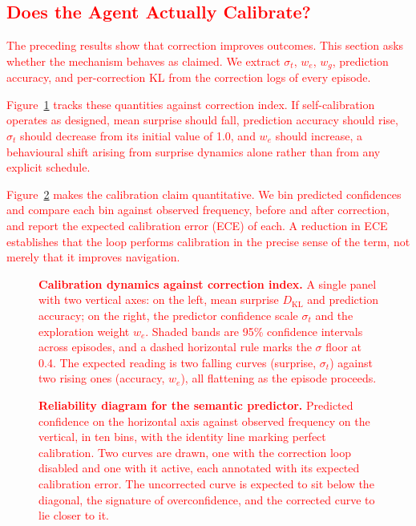 \subsection{\textcolor{red}{Does the Agent Actually Calibrate?}}

\textcolor{red}{The preceding results show that correction improves outcomes. This section asks whether the mechanism behaves as claimed. We extract $\sigma_t$, $w_e$, $w_g$, prediction accuracy, and per-correction KL from the correction logs of every episode.}

\textcolor{red}{Figure~\ref{fig:calib} tracks these quantities against correction index. If self-calibration operates as designed, mean surprise should fall, prediction accuracy should rise, $\sigma_t$ should decrease from its initial value of 1.0, and $w_e$ should increase, a behavioural shift arising from surprise dynamics alone rather than from any explicit schedule.}

\textcolor{red}{Figure~\ref{fig:reliability} makes the calibration claim quantitative. We bin predicted confidences and compare each bin against observed frequency, before and after correction, and report the expected calibration error (ECE) of each. A reduction in ECE establishes that the loop performs calibration in the precise sense of the term, not merely that it improves navigation.}

\textcolor{red}{
\begin{figure}[H]
\centering
\plotbox{5.0cm}
\caption{\textcolor{red}{\textbf{Calibration dynamics against correction index.} A single panel with two vertical axes: on the left, mean surprise $D_{\mathrm{KL}}$ and prediction accuracy; on the right, the predictor confidence scale $\sigma_t$ and the exploration weight $w_e$. Shaded bands are 95\% confidence intervals across episodes, and a dashed horizontal rule marks the $\sigma$ floor at 0.4. The expected reading is two falling curves (surprise, $\sigma_t$) against two rising ones (accuracy, $w_e$), all flattening as the episode proceeds.}}
\label{fig:calib}
\end{figure}
}

\textcolor{red}{
\begin{figure}[H]
\centering
\plotbox{4.6cm}
\caption{\textcolor{red}{\textbf{Reliability diagram for the semantic predictor.} Predicted confidence on the horizontal axis against observed frequency on the vertical, in ten bins, with the identity line marking perfect calibration. Two curves are drawn, one with the correction loop disabled and one with it active, each annotated with its expected calibration error. The uncorrected curve is expected to sit below the diagonal, the signature of overconfidence, and the corrected curve to lie closer to it.}}
\label{fig:reliability}
\end{figure}
}

